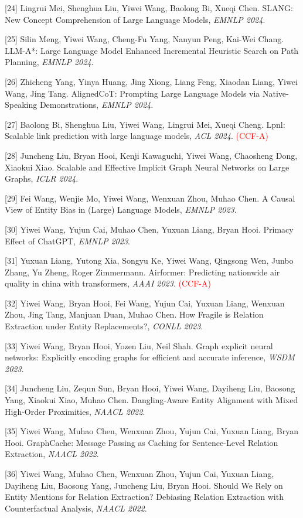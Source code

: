 [24] Lingrui Mei, Shenghua Liu, Yiwei Wang, Baolong Bi, Xueqi Chen. SLANG: New Concept Comprehension of Large Language Models, \textit{EMNLP 2024}.

[25] Silin Meng, Yiwei Wang, Cheng-Fu Yang, Nanyun Peng, Kai-Wei Chang. LLM-A*: Large Language Model Enhanced Incremental Heuristic Search on Path Planning, \textit{EMNLP 2024}.

[26] Zhicheng Yang, Yinya Huang, Jing Xiong, Liang Feng, Xiaodan Liang, Yiwei Wang, Jing Tang. AlignedCoT: Prompting Large Language Models via Native-Speaking Demonstrations, \textit{EMNLP 2024}.

[27] Baolong Bi, Shenghua Liu, Yiwei Wang, Lingrui Mei, Xueqi Cheng. Lpnl: Scalable link prediction with large language models, \textit{ACL 2024}. \textcolor{red}{(CCF-A)}

[28] Juncheng Liu, Bryan Hooi, Kenji Kawaguchi, Yiwei Wang, Chaosheng Dong, Xiaokui Xiao. Scalable and Effective Implicit Graph Neural Networks on Large Graphs, \textit{ICLR 2024}.

[29] Fei Wang, Wenjie Mo, Yiwei Wang, Wenxuan Zhou, Muhao Chen. A Causal View of Entity Bias in (Large) Language Models, \textit{EMNLP 2023}.

[30] Yiwei Wang, Yujun Cai, Muhao Chen, Yuxuan Liang, Bryan Hooi. Primacy Effect of ChatGPT, \textit{EMNLP 2023}.

[31] Yuxuan Liang, Yutong Xia, Songyu Ke, Yiwei Wang, Qingsong Wen, Junbo Zhang, Yu Zheng, Roger Zimmermann. Airformer: Predicting nationwide air quality in china with transformers, \textit{AAAI 2023}. \textcolor{red}{(CCF-A)}

[32] Yiwei Wang, Bryan Hooi, Fei Wang, Yujun Cai, Yuxuan Liang, Wenxuan Zhou, Jing Tang, Manjuan Duan, Muhao Chen. How Fragile is Relation Extraction under Entity Replacements?, \textit{CONLL 2023}.

[33] Yiwei Wang, Bryan Hooi, Yozen Liu, Neil Shah. Graph explicit neural networks: Explicitly encoding graphs for efficient and accurate inference, \textit{WSDM 2023}.

[34] Juncheng Liu, Zequn Sun, Bryan Hooi, Yiwei Wang, Dayiheng Liu, Baosong Yang, Xiaokui Xiao, Muhao Chen. Dangling-Aware Entity Alignment with Mixed High-Order Proximities, \textit{NAACL 2022}.

[35] Yiwei Wang, Muhao Chen, Wenxuan Zhou, Yujun Cai, Yuxuan Liang, Bryan Hooi. GraphCache: Message Passing as Caching for Sentence-Level Relation Extraction, \textit{NAACL 2022}.

[36] Yiwei Wang, Muhao Chen, Wenxuan Zhou, Yujun Cai, Yuxuan Liang, Dayiheng Liu, Baosong Yang, Juncheng Liu, Bryan Hooi. Should We Rely on Entity Mentions for Relation Extraction? Debiasing Relation Extraction with Counterfactual Analysis, \textit{NAACL 2022}.

